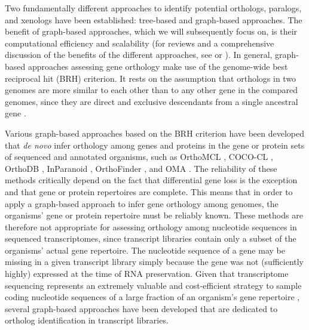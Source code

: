 Two fundamentally different approaches to identify potential orthologs,
paralogs, and xenologs have been established: tree-based and graph-based
approaches. The benefit of graph-based approaches, which we will
subsequently focus on, is their computational efficiency and scalability
(for reviews and a comprehensive discussion of the benefits of the
different approaches, see \cite{Dutilh2007} or \cite{Kristensen2011}).
In general, graph-based approaches assessing gene orthology make use of
the genome-wide best reciprocal hit (BRH) criterion. It rests on the
assumption that orthologs in two genomes are more similar to each other
than to any other gene in the compared genomes, since they are direct
and exclusive descendants from a single ancestral gene
\cite{Altenhoff2012}.

Various graph-based approaches based on the BRH criterion have been
developed that \emph{de novo} infer orthology among genes and proteins
in the gene or protein sets of sequenced and annotated organisms, such
as OrthoMCL \cite{Li2003}, COCO-CL \cite{Jothi2006}, OrthoDB
\cite{Kriventseva2015}, InParanoid \cite{Sonnhammer2015}, OrthoFinder
\cite{Emms2015}, and OMA \cite{Altenhoff2015}. The reliability of
these methods critically depend on the fact that differential gene loss
is the exception and that gene or protein repertoires are complete. This
means that in order to apply a graph-based approach to infer gene
orthology among genomes, the organisms' gene or protein repertoire must
be reliably known. These methods are therefore not appropriate for
assessing orthology among nucleotide sequences in sequenced
transcriptomes, since transcript libraries contain only a subset of the
organisms' actual gene repertoire. The nucleotide sequence of a gene may
be missing in a given transcript library simply because the gene was not
(sufficiently highly) expressed at the time of RNA preservation. Given
that transcriptome sequencing represents an extremely valuable and
cost-efficient strategy to sample coding nucleotide sequences of a large
fraction of an organism's gene repertoire \cite{Misof2014}, several
graph-based approaches have been developed that are dedicated to
ortholog identification in transcript libraries.

